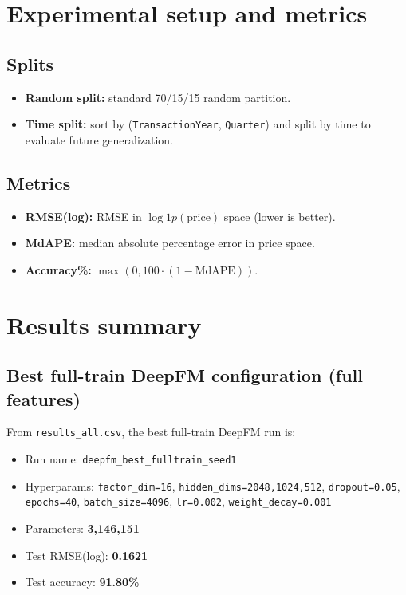 \documentclass[11pt]{article}
\newcommand{\BestDeepfmRunName}{\texttt{deepfm\_best\_fulltrain\_seed1}}
\newcommand{\BestDeepfmTestRmse}{0.1621}
\newcommand{\BestDeepfmTestAcc}{91.80}
\newcommand{\BestDeepfmNParams}{3{,}146{,}151}
\begin{document}
\section{Experimental setup and metrics}
\subsection{Splits}
\begin{itemize}[leftmargin=*]
  \item \textbf{Random split:} standard 70/15/15 random partition.
  \item \textbf{Time split:} sort by (\texttt{TransactionYear}, \texttt{Quarter}) and split by time to evaluate future generalization.
\end{itemize}

\subsection{Metrics}
\begin{itemize}[leftmargin=*]
  \item \textbf{RMSE(log):} RMSE in \(\log1p(\text{price})\) space (lower is better).
  \item \textbf{MdAPE:} median absolute percentage error in price space.
  \item \textbf{Accuracy\%:} \(\max(0,100\cdot(1-\text{MdAPE}))\).
\end{itemize}

\section{Results summary}
\subsection{Best full-train DeepFM configuration (full features)}
From \texttt{results\_all.csv}, the best full-train DeepFM run is:
\begin{itemize}[leftmargin=*]
  \item Run name: \BestDeepfmRunName
  \item Hyperparams: \texttt{factor\_dim=16}, \texttt{hidden\_dims=2048,1024,512}, \texttt{dropout=0.05}, \texttt{epochs=40}, \texttt{batch\_size=4096}, \texttt{lr=0.002}, \texttt{weight\_decay=0.001}
  \item Parameters: \textbf{\BestDeepfmNParams}
  \item Test RMSE(log): \textbf{\BestDeepfmTestRmse}
  \item Test accuracy: \textbf{\BestDeepfmTestAcc\%}
\end{itemize}
\end{document}
